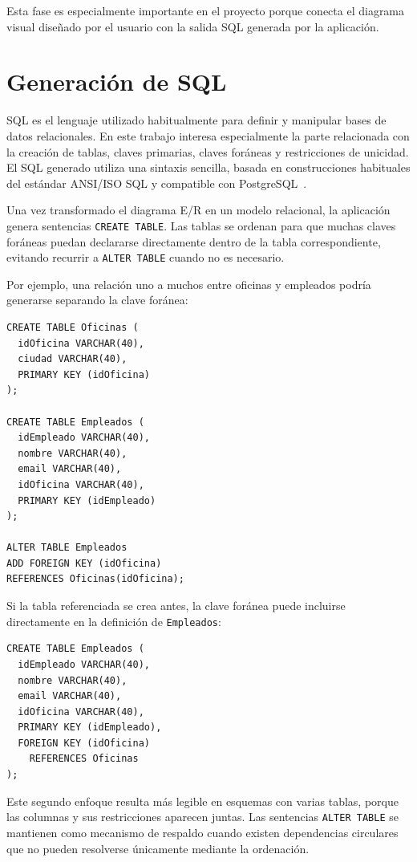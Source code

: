 Esta fase es especialmente importante en el proyecto porque conecta el diagrama visual diseñado por el usuario con la salida SQL generada por la aplicación.

\section{Generación de SQL}

SQL es el lenguaje utilizado habitualmente para definir y manipular bases de datos relacionales. En este trabajo interesa especialmente la parte relacionada con la creación de tablas, claves primarias, claves foráneas y restricciones de unicidad. El SQL generado utiliza una sintaxis sencilla, basada en construcciones habituales del estándar ANSI/ISO SQL y compatible con PostgreSQL~\cite{postgresqlCreateTable}.

Una vez transformado el diagrama E/R en un modelo relacional, la aplicación genera sentencias \texttt{CREATE TABLE}. Las tablas se ordenan para que muchas claves foráneas puedan declararse directamente dentro de la tabla correspondiente, evitando recurrir a \texttt{ALTER TABLE} cuando no es necesario.

Por ejemplo, una relación uno a muchos entre oficinas y empleados podría generarse separando la clave foránea:

\begin{verbatim}
CREATE TABLE Oficinas (
  idOficina VARCHAR(40),
  ciudad VARCHAR(40),
  PRIMARY KEY (idOficina)
);

CREATE TABLE Empleados (
  idEmpleado VARCHAR(40),
  nombre VARCHAR(40),
  email VARCHAR(40),
  idOficina VARCHAR(40),
  PRIMARY KEY (idEmpleado)
);

ALTER TABLE Empleados
ADD FOREIGN KEY (idOficina)
REFERENCES Oficinas(idOficina);
\end{verbatim}

Si la tabla referenciada se crea antes, la clave foránea puede incluirse directamente en la definición de \texttt{Empleados}:

\begin{verbatim}
CREATE TABLE Empleados (
  idEmpleado VARCHAR(40),
  nombre VARCHAR(40),
  email VARCHAR(40),
  idOficina VARCHAR(40),
  PRIMARY KEY (idEmpleado),
  FOREIGN KEY (idOficina)
    REFERENCES Oficinas
);
\end{verbatim}

Este segundo enfoque resulta más legible en esquemas con varias tablas, porque las columnas y sus restricciones aparecen juntas. Las sentencias \texttt{ALTER TABLE} se mantienen como mecanismo de respaldo cuando existen dependencias circulares que no pueden resolverse únicamente mediante la ordenación.

